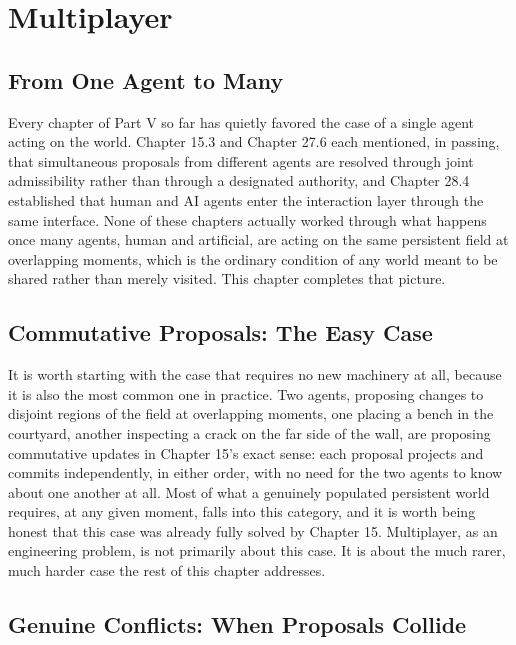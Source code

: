\chapter{Multiplayer}

\section{From One Agent to Many}

Every chapter of Part V so far has quietly favored the case of a single agent acting on the world. Chapter 15.3 and Chapter 27.6 each mentioned, in passing, that simultaneous proposals from different agents are resolved through joint admissibility rather than through a designated authority, and Chapter 28.4 established that human and AI agents enter the interaction layer through the same interface. None of these chapters actually worked through what happens once many agents, human and artificial, are acting on the same persistent field at overlapping moments, which is the ordinary condition of any world meant to be shared rather than merely visited. This chapter completes that picture.

\section{Commutative Proposals: The Easy Case}

It is worth starting with the case that requires no new machinery at all, because it is also the most common one in practice. Two agents, proposing changes to disjoint regions of the field at overlapping moments, one placing a bench in the courtyard, another inspecting a crack on the far side of the wall, are proposing commutative updates in Chapter 15's exact sense: each proposal projects and commits independently, in either order, with no need for the two agents to know about one another at all. Most of what a genuinely populated persistent world requires, at any given moment, falls into this category, and it is worth being honest that this case was already fully solved by Chapter 15. Multiplayer, as an engineering problem, is not primarily about this case. It is about the much rarer, much harder case the rest of this chapter addresses.

\section{Genuine Conflicts: When Proposals Collide}

